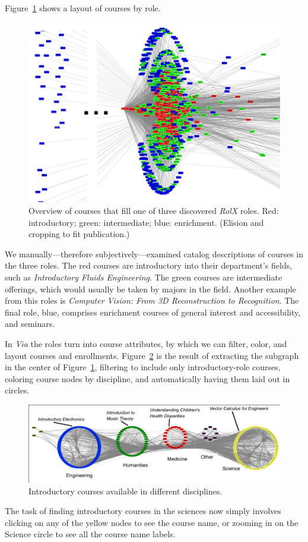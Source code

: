 Figure~\ref{fig:rolxOverview} shows a layout of courses by role.
\begin{figure}
    \centering
    \includegraphics{Figs/rolxOverviewCropped2PhotoshopCroppedDoctoredWhite.png}
    \caption{Overview of courses that fill one of three discovered
      {\em RolX} roles. Red: introductory; green: intermediate; blue:
      enrichment. (Elision and cropping to fit publication.)}
    \label{fig:rolxOverview}
\end{figure}
We manually---therefore subjectively---examined catalog descriptions
of courses in the three roles. The red courses are introductory into
their department's fields, such as {\em Introductory Fluids
  Engineering}. The green courses are intermediate offerings, which
would usually be taken by majors in the field. Another example from
this roles is {\em Computer Vision: From 3D Reconstruction to
  Recognition}. The final role, blue, comprises enrichment courses of
general interest and accessibility, and seminars.

In {\em Via} the roles turn into course attributes, by which we can
filter, color, and layout courses and
enrollments. Figure~\ref{fig:rolxIntroCourses} is the result of extracting
the subgraph in the center of Figure~\ref{fig:rolxOverview},
filtering to include only introductory-role courses, coloring course
nodes by discipline, and automatically having them laid out in
circles.
\begin{figure}
    \centering
    \includegraphics[width=\textwidth]{Figs/rolxIntroCoursesByDepartmentCroppedAnnotated.pdf}
    \caption{Introductory courses available in different
      disciplines.}
    \label{fig:rolxIntroCourses}
\end{figure}
The task of finding introductory courses in the sciences now simply
involves clicking on any of the yellow nodes to see the course name,
or zooming in on the Science circle to see all the course name labels.

